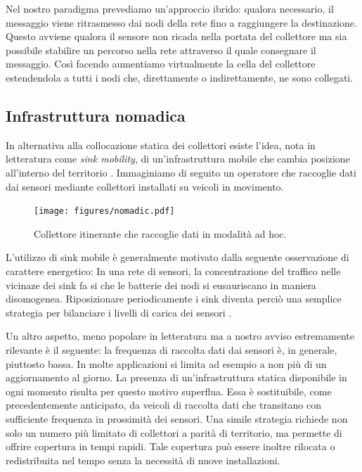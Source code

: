 \documentclass[a4paper,12pt]{article}
\theoremstyle{definition}
\begin{document}
Nel nostro paradigma prevediamo un'approccio ibrido: qualora necessario, il messaggio viene ritrasmesso dai nodi della rete fino a raggiungere la destinazione. Questo avviene qualora il sensore non ricada nella portata del collettore ma sia possibile stabilire un percorso nella rete attraverso il quale consegnare il messaggio. Così facendo aumentiamo virtualmente la cella del collettore estendendola a tutti i nodi che, direttamente o indirettamente, ne sono collegati.

\subsection{Infrastruttura nomadica}

In alternativa alla collocazione statica dei collettori esiste l'idea, nota in letteratura come \emph{sink mobility}, di un'infrastruttura mobile che cambia posizione all'interno del territorio \cite{sinkmob}. Immaginiamo di seguito un operatore che raccoglie dati dai sensori mediante collettori installati su veicoli in movimento.


\begin{figure}[H]
\centering
\texttt{[image: figures/nomadic.pdf]}
\caption{Collettore itinerante che raccoglie dati in modalità ad hoc.}
\end{figure}

L'utilizzo di sink mobile è generalmente motivato dalla seguente osservazione di carattere energetico: In una rete di sensori, la concentrazione del traffico nelle vicinaze dei sink fa si che le batterie dei nodi si eusauriscano in maniera disomogenea. Riposizionare periodicamente i sink diventa perciò una semplice strategia per bilanciare i livelli di carica dei sensori \cite{moblife1, moblife2}.

Un altro aspetto, meno popolare in letteratura ma a nostro avviso estremamente rilevante è il seguente: la frequenza di raccolta dati dai sensori è, in generale, piuttosto bassa. In molte applicazioni si limita ad esempio a non più di un aggiornamento al giorno. La presenza di un'infrastruttura statica disponibile in ogni momento risulta per questo motivo superflua. Essa è sostituibile, come precedentemente anticipato, da veicoli di raccolta dati che transitano con sufficiente frequenza in prossimità dei sensori. Una simile strategia richiede non solo un numero più limitato di collettori a parità di territorio, ma permette di offrire copertura in tempi rapidi. Tale copertura può essere inoltre rilocata o redistribuita nel tempo senza la necessità di nuove installazioni.
\end{document}
